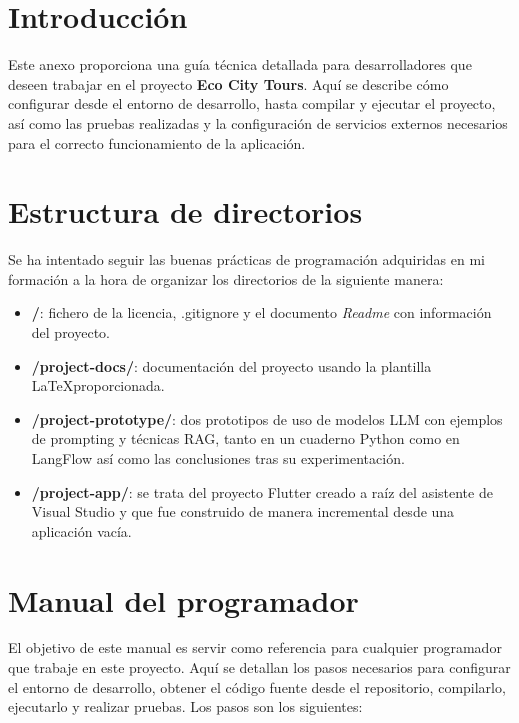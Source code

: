 
\section{Introducción}
Este anexo proporciona una guía técnica detallada para desarrolladores que deseen trabajar en el proyecto \textbf{Eco City Tours}. Aquí se describe cómo configurar desde el entorno de desarrollo, hasta compilar y ejecutar el proyecto, así como las pruebas realizadas y la configuración de servicios externos necesarios para el correcto funcionamiento de la aplicación. 

\section{Estructura de directorios}
Se ha intentado seguir las buenas prácticas de programación adquiridas en mi formación a la hora de organizar los directorios de la siguiente manera:
\begin{itemize}
	
	\item \textbf{/}: fichero de la licencia, .gitignore y el documento \textit{Readme} con información del proyecto.
	
	\item \textbf{/project-docs/}: documentación del proyecto usando la plantilla \LaTeX  proporcionada.
	
	\item \textbf{/project-prototype/}: dos prototipos de uso de modelos LLM con ejemplos de prompting y técnicas RAG, tanto en un cuaderno Python como en LangFlow así como las conclusiones tras su experimentación.
	
	\item \textbf{/project-app/}: se trata del proyecto Flutter creado a raíz del asistente de Visual Studio y que fue construido de manera incremental desde una aplicación vacía.
	
	
\end{itemize}

\section{Manual del programador}

El objetivo de este manual es servir como referencia para cualquier programador que trabaje en este proyecto. Aquí se detallan los pasos necesarios para configurar el entorno de desarrollo, obtener el código fuente desde el repositorio, compilarlo, ejecutarlo y realizar pruebas. Los pasos son los siguientes:

